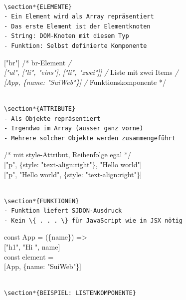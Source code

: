 \documentclass[10pt]{article}
\begin{document}
\begin{verbatim}

\section*{ELEMENTE}
- Ein Element wird als Array repräsentiert
- Das erste Element ist der Elementknoten
- String: DOM-Knoten mit diesem Typ
- Funktion: Selbst definierte Komponente
\end{verbatim}

["br"] /* br-Element \textit{/\\[0pt]
["ul", ["li", "eins"], ["li", "zwei"]] /} Liste mit zwei Items \textit{/\\[0pt]
[App, \{name: "SuiWeb"\}] /} Funktionskomponente */

\begin{verbatim}

\section*{ATTRIBUTE}
- Als Objekte repräsentiert
- Irgendwo im Array (ausser ganz vorne)
- Mehrere solcher Objekte werden zusammengeführt
\end{verbatim}

/* mit style-Attribut, Reihenfolge egal */\\[0pt]
["p", \{style: "text-align:right"\}, "Hello world"]\\[0pt]
["p", "Hello world", \{style: "text-align:right"\}]

\begin{verbatim}

\section*{FUNKTIONEN}
- Funktion liefert SJDON-Ausdruck
- Kein \{ . . . \} für JavaScript wie in JSX nötig
\end{verbatim}

const App = (\{name\}) =>\\[0pt]
["h1", "Hi ", name]\\
const element =\\[0pt]
[App, \{name: "SuiWeb"\}]

\begin{verbatim}

\section*{BEISPIEL: LISTENKOMPONENTE}
\end{verbatim}
\end{document}
